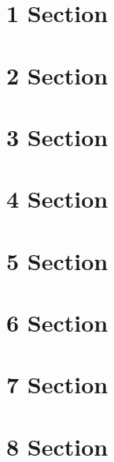 \documentclass{beamer}
\begin{document}
    \section{1 Section}
    \section{2 Section}
    \section{3 Section}
    \section{4 Section}
    \section{5 Section}
    \section{6 Section} 
    \section{7 Section}
    \section{8 Section}

    \begin{frame}
        \begin{columns}
            \begin{column}{.45\textwidth}
                \tableofcontents[sections=1-4]
            \end{column}
            \begin{column}{.45\textwidth}
                \tableofcontents[sections=5-8]
            \end{column}
        \end{columns}
    \end{frame}
\end{document}
